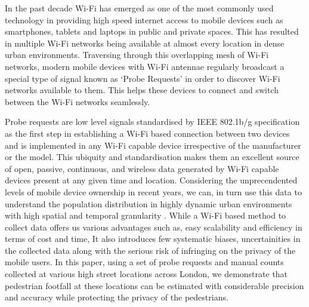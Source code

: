 In the past decade Wi-Fi has emerged as one of the most commonly used technology in providing high speed internet access to mobile devices such as smartphones, tablets and laptops in public and private spaces.
This has resulted in multiple Wi-Fi networks being available at almost every location in dense urban environments. 
Traversing through this overlapping mesh of Wi-Fi networks, modern mobile devices with Wi-Fi antennae regularly broadcast a special type of signal known as `Probe Requests' in order to discover Wi-Fi networks available to them.
This helps these devices to connect and switch between the Wi-Fi networks seamlessly.

Probe requests are low level signals standardised by IEEE 802.1b/g specification \citep{ieee2013} as the first step in establishing a Wi-Fi based connection between two devices and is implemented in any Wi-Fi capable device irrespective of the manufacturer or the model.
This ubiquity and standardisation makes them an excellent source of open, passive, continuous, and wireless data generated by Wi-Fi capable devices present at any given time and location.
Considering the unprecendented levels of mobile device ownership in recent years, we can, in turn use this data to understand the population distribution in highly dynamic urban environments with high spatial and temporal granularity \citep{freud2015,konto2017}. While a Wi-Fi based method to collect data offers us various advantages such as, easy scalability and efficiency in terms of cost and time, It also introduces few systematic biases, uncertainities in the collected data along with the serious risk of infringing on the privacy of the mobile users.
In this paper, using a set of probe requests and manual counts collected at various high street locations across London, we demonstrate that pedestrian footfall at these locations can be estimated with considerable precision and accuracy while protecting the privacy of the pedestrians.

